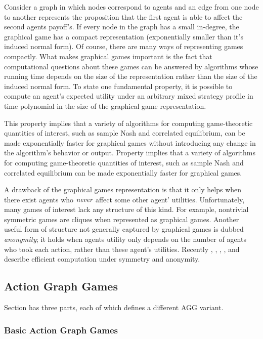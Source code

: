 Consider a graph in which nodes correspond to agents and an edge from one node to another represents the proposition that the first agent is able to affect the second agents payoff's. If every node in the graph has a small in-degree, the graphical game has a compact representation (exponentially smaller than it's induced normal form). Of course, there are many ways of representing games compactly. What makes graphical games important is the fact that computational questions about these games can be answered by algorithms whose running time depends on the size of the representation rather than the size of the induced normal form. To state one fundamental property, it is possible to compute an agent's expected utility under an arbitrary mixed strategy profile in time polynomial in the size of the graphical game representation. 

This property implies that a variety of algorithms for computing game-theoretic quantities of interest, such as sample Nash and correlated equilibrium, can be made exponentially faster for graphical games without introducing any change in the algorithm's behavior or output. Property implies that a variety of algorithms for computing game-theoretic quantities of interest, such as sample Nash and correlated equilibrium can be made exponentially faster for graphical games.

A drawback of the graphical games representation is that it only helps when there exist agents who $\emph{never}$ affect some other agent' utilities. Unfortunately, many games of interest lack any structure of this kind. For example, nontrivial symmetric games are cliques when represented as graphical games. Another useful form of structure not generally captured by graphical games is dubbed \emph{anonymity}; it holds when agents utility only depends on the number of agents who took each action, rather than these agent's utilities. Recently \citet{PR-2008}, \citet{KV-200}, \citet{DP-2008}, \citet{BFH-2011}, and describe efficient computation under symmetry and anonymity.

\subsection{Action Graph Games}

Section has three parts, each of which defines a different AGG variant.

\subsubsection{Basic Action Graph Games}

